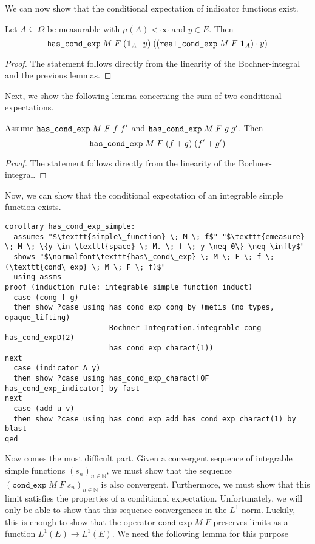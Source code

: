 We can now show that the conditional expectation of indicator functions exist.

\begin{lemma}
	Let $A \subseteq \Omega$ be measurable with $\mu(A) < \infty$ and $y \in E$. Then
	\[
		\normalfont\texttt{has\_cond\_exp} \; M \; F \; (\mathbf{1}_A \cdot y) \; ((\texttt{real\_cond\_exp} \; M \; F \; \mathbf{1}_A) \cdot y)
	\]
\end{lemma}
\begin{proof}
	The statement follows directly from the linearity of the Bochner-integral and the previous lemmas.
\end{proof}

Next, we show the following lemma concerning the sum of two conditional expectations.

\begin{lemma}
	Assume $\normalfont\texttt{has\_cond\_exp} \; M \; F \; f \; f'$ and $\normalfont\texttt{has\_cond\_exp} \; M \; F \; g \; g'$. Then
	\[
		\normalfont\texttt{has\_cond\_exp} \; M \; F \; (f + g) \; (f' + g')
	\]
\end{lemma}
\begin{proof}
	The statement follows directly from the linearity of the Bochner-integral.
\end{proof}

Now, we can show that the conditional expectation of an integrable simple function exists.

\begin{isalemma}
{\small
	\begin{lstlisting}[style=isabelle]
corollary has_cond_exp_simple:
  assumes "$\texttt{simple\_function} \; M \; f$" "$\texttt{emeasure} \; M \; \{y \in \texttt{space} \; M. \; f \; y \neq 0\} \neq \infty$"
  shows "$\normalfont\texttt{has\_cond\_exp} \; M \; F \; f \; (\texttt{cond\_exp} \; M \; F \; f)$"
  using assms
proof (induction rule: integrable_simple_function_induct)
  case (cong f g)
  then show ?case using has_cond_exp_cong by (metis (no_types, opaque_lifting)
						Bochner_Integration.integrable_cong has_cond_expD(2)
						has_cond_exp_charact(1))
next
  case (indicator A y)
  then show ?case using has_cond_exp_charact[OF has_cond_exp_indicator] by fast
next
  case (add u v)
  then show ?case using has_cond_exp_add has_cond_exp_charact(1) by blast
qed
	\end{lstlisting}
}
\end{isalemma}

Now comes the most difficult part. Given a convergent sequence of integrable simple functions $(s_n)_{n \in \mathbb{N}}$, we must show that the sequence $(\texttt{cond\_exp} \; M \; F \; s_n)_{n \in \mathbb{N}}$ is also convergent. Furthermore, we must show that this limit satisfies the properties of a conditional expectation. Unfortunately, we will only be able to show that this sequence convergences in the $L^1$-norm. Luckily, this is enough to show that the operator $\texttt{cond\_exp} \; M \; F$ preserves limits as a function $L^1(E) \rightarrow L^1(E)$. We need the following lemma for this purpose

